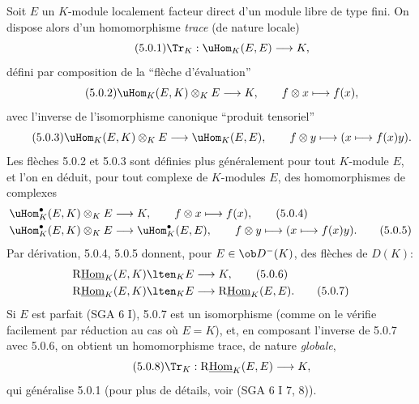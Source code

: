 Soit $E$ un $K$-module localement facteur direct d'un module libre de type fini. On dispose alors d'un homomorphisme \emph{trace} (de nature locale)
\begin{equation}\tag{5.0.1}
\Tr_K:\uHom_K(E,E)\longrightarrow K,
\end{equation}
défini par composition de la ``flèche d'évaluation''
\begin{equation}\tag{5.0.2}
\uHom_K(E,K)\otimes_KE\longrightarrow K,\qquad f\otimes x\longmapsto f(x),
\end{equation}
avec l'inverse de l'isomorphisme canonique ``produit tensoriel''
\begin{equation}\tag{5.0.3}
\uHom_K(E,K)\otimes_KE\longrightarrow\uHom_K(E,E),\qquad f\otimes y\longmapsto (x\longmapsto f(x)y).
\end{equation}
Les flèches 5.0.2 et 5.0.3 sont définies plus généralement pour tout $K$-module $E$, et l'on en déduit, pour tout complexe de $K$-modules $E$, des homomorphismes de complexes
\begin{align}
\uHom_K^\bullet(E,K)\otimes_KE&\longrightarrow K,\qquad f\otimes x\longmapsto f(x),\tag{5.0.4}\\
\uHom_K^\bullet(E,K)\otimes_KE&\longrightarrow \uHom_K^\bullet(E,E),\qquad f\otimes y\longmapsto (x\longmapsto f(x)y).\tag{5.0.5}
\end{align}
Par dérivation, 5.0.4, 5.0.5 donnent, pour $E\in\ob D^-(K)$, des flèches de $D(K)$:
\begin{align}
\mathrm{R}\underline{\mathrm{Hom}}_K(E,K)\lten_KE&\longrightarrow K,\tag{5.0.6}\\
\mathrm{R}\underline{\mathrm{Hom}}_K(E,K)\lten_KE&\longrightarrow\mathrm{R}\underline{\mathrm{Hom}}_K(E,E).\tag{5.0.7}
\end{align}
Si $E$ est
parfait (SGA 6 I), 5.0.7 est un isomorphisme (comme on le vérifie facilement par réduction au cas où $E=K$), et, en composant l'inverse de 5.0.7 avec 5.0.6, on obtient un homomorphisme trace, de nature \emph{globale},
\begin{equation}\tag{5.0.8}
\Tr_K:\mathrm{R}\underline{\mathrm{Hom}}_K(E,E)\longrightarrow K,
\end{equation}
qui généralise 5.0.1 (pour plus de détails, voir (SGA 6 I 7, 8)).

